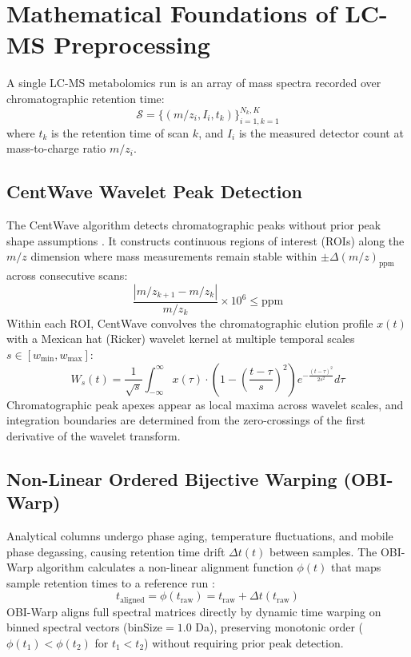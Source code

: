 \documentclass[11pt,twoside,openright]{book}
\begin{document}
\FloatBarrier
\section{Mathematical Foundations of LC-MS Preprocessing}
\label{sec:xcms_math}

A single LC-MS metabolomics run is an array of mass spectra recorded over chromatographic retention time:
\begin{equation}
\mathcal{S} = \big\{ (m/z_i, I_i, t_k) \big\}_{i=1, k=1}^{N_k, K}
\label{eq:raw_lcms_array}
\end{equation}
where $t_k$ is the retention time of scan $k$, and $I_i$ is the measured detector count at mass-to-charge ratio $m/z_i$.

\subsection{CentWave Wavelet Peak Detection}

The CentWave algorithm detects chromatographic peaks without prior peak shape assumptions \cite{tautenhahn2008centwave}. It constructs continuous regions of interest (ROIs) along the $m/z$ dimension where mass measurements remain stable within $\pm \Delta(m/z)_{\text{ppm}}$ across consecutive scans:
\begin{equation}
\frac{|m/z_{k+1} - m/z_k|}{m/z_k} \times 10^6 \le \text{ppm}
\label{eq:ppm_tolerance}
\end{equation}
Within each ROI, CentWave convolves the chromatographic elution profile $x(t)$ with a Mexican hat (Ricker) wavelet kernel at multiple temporal scales $s \in [w_{\min}, w_{\max}]$:
\begin{equation}
W_s(t) = \frac{1}{\sqrt{s}} \int_{-\infty}^{\infty} x(\tau) \cdot \left( 1 - \left(\frac{t - \tau}{s}\right)^2 \right) e^{-\frac{(t - \tau)^2}{2s^2}} d\tau
\label{eq:wavelet_transform}
\end{equation}
Chromatographic peak apexes appear as local maxima across wavelet scales, and integration boundaries are determined from the zero-crossings of the first derivative of the wavelet transform.

\subsection{Non-Linear Ordered Bijective Warping (OBI-Warp)}

Analytical columns undergo phase aging, temperature fluctuations, and mobile phase degassing, causing retention time drift $\Delta t(t)$ between samples. The OBI-Warp algorithm calculates a non-linear alignment function $\phi(t)$ that maps sample retention times to a reference run \cite{prince2006obiwarp, mahieu2016warping}:
\begin{equation}
t_{\text{aligned}} = \phi(t_{\text{raw}}) = t_{\text{raw}} + \Delta t(t_{\text{raw}})
\label{eq:obiwarp_mapping}
\end{equation}
OBI-Warp aligns full spectral matrices directly by dynamic time warping on binned spectral vectors ($\text{binSize} = 1.0$ Da), preserving monotonic order ($\phi(t_1) < \phi(t_2)$ for $t_1 < t_2$) without requiring prior peak detection.
\end{document}
